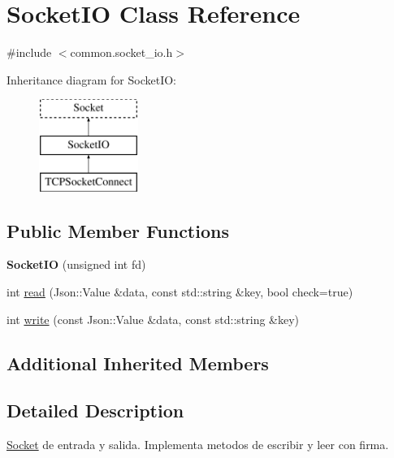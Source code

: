 \hypertarget{classSocketIO}{\section{Socket\-I\-O Class Reference}
\label{classSocketIO}
}


{\ttfamily \#include $<$common.\-socket\-\_\-io.\-h$>$}

Inheritance diagram for Socket\-I\-O\-:\begin{figure}[H]
\begin{center}
\leavevmode
\includegraphics[height=3.000000cm]{classSocketIO}
\end{center}
\end{figure}
\subsection*{Public Member Functions}
\begin{DoxyCompactItemize}
\item 
\hypertarget{classSocketIO_a6fab1f7899e781b7fea87fbdc6c0e353}{{\bfseries Socket\-I\-O} (unsigned int fd)}\label{classSocketIO_a6fab1f7899e781b7fea87fbdc6c0e353}

\item 
int \hyperlink{classSocketIO_aa9f50be5a8b12fbab93893de212b8a59}{read} (Json\-::\-Value \&data, const std\-::string \&key, bool check=true)
\item 
int \hyperlink{classSocketIO_a29877c264b1d6c116d07e0a9f76c5373}{write} (const Json\-::\-Value \&data, const std\-::string \&key)
\end{DoxyCompactItemize}
\subsection*{Additional Inherited Members}


\subsection{Detailed Description}
\hyperlink{classSocket}{Socket} de entrada y salida. Implementa metodos de escribir y leer con firma. 

